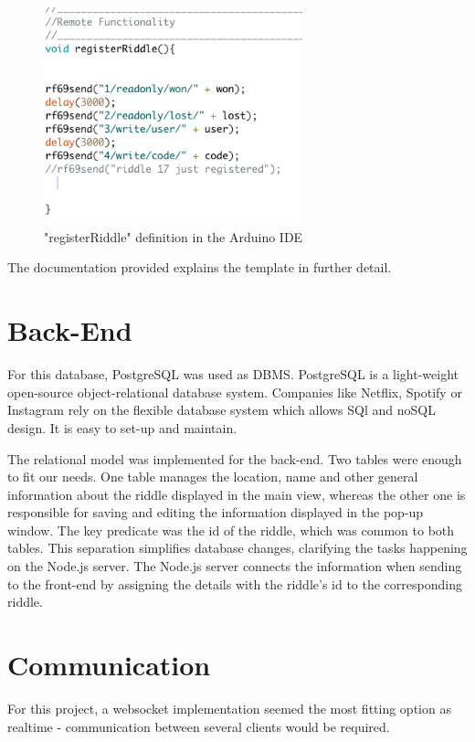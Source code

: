 \begin{figure}[th]
	\centering
	\includegraphics[width=75mm,scale=0.75]{Figures/registerRiddle}
	\decoRule
	\caption[registerRiddle]{"registerRiddle" definition in the Arduino IDE}
	\label{fig:registerRiddle}
\end{figure}

The documentation provided explains the template in further detail.

\section{Back-End}

For this database, PostgreSQL was used as DBMS.
PostgreSQL is a light-weight open-source object-relational database system. 
Companies like Netflix, Spotify or Instagram \parencite{postgresUsers} rely on the flexible database system which allows SQl and noSQL design.
It is easy to set-up and maintain. 

The relational model was implemented for the back-end.
Two tables were enough to fit our needs.
One table manages the location, name and other general information about the riddle displayed in the main view,
whereas the other one is responsible for saving and editing the information displayed in the pop-up window.
The key predicate was the id of the riddle, which was common to both tables.
This separation simplifies database changes, clarifying the tasks happening on the Node.js server.
The Node.js server connects the information when sending to the front-end by assigning the details with the riddle's id to the corresponding riddle.

\section{Communication}

For this project, a websocket implementation seemed the most fitting option as realtime - communication between several clients would be required.
 
